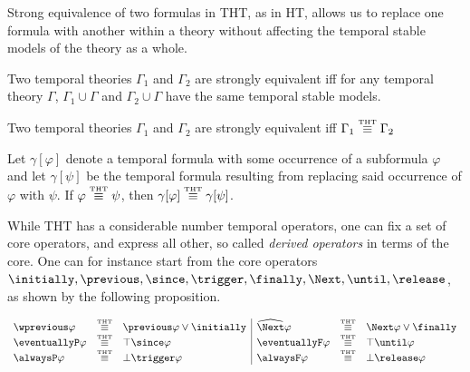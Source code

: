 Strong equivalence of two formulas in THT, as in HT, allows us to
replace one formula with another within a theory without affecting the
temporal stable models of the theory as a whole.

\begin{definition}
  Two temporal theories $\Gamma_1$ and $\Gamma_2$ are strongly
  equivalent iff for any temporal theory $\Gamma$,
  $\Gamma_1 \cup \Gamma$ and $\Gamma_2 \cup \Gamma$ have the same
  temporal stable models.
\end{definition}

\begin{proposition}
  Two temporal theories $\Gamma_1$ and $\Gamma_2$ are strongly equivalent
  iff $\Gamma_1 \stackrel{\normalfont\mbox{\tiny THT}}{\equiv} \Gamma_2$
\end{proposition}

\begin{proposition}
  Let $\gamma[\varphi]$ denote a temporal formula with some occurrence of a
  subformula $\varphi$ and let $\gamma[\psi]$ be the temporal formula resulting
  from replacing said occurrence of $\varphi$ with $\psi$. If
  $\varphi \stackrel{\normalfont\mbox{\tiny THT}}{\equiv} \psi$, then $\gamma[\varphi] \stackrel{\normalfont\mbox{\tiny THT}}{\equiv} \gamma[\psi]$.
\end{proposition}

While THT has a considerable number temporal operators, one can fix a
set of core operators, and express all other, so called \emph{derived
  operators} in terms of the core. One can for instance start from the
core operators
$\initially, \previous, \since, \trigger, \finally, \Next, \until,
\release$, as shown by the following proposition.

\begin{proposition}\label{prop:derived-op}
\[
\begin{array}{lll|lll}
\wprevious \varphi & \equivtht & \previous \varphi \vee \initially &
\wnext \varphi & \equivtht & \Next \varphi \vee \finally\\
\eventuallyP \varphi & \equivtht & \top \since \varphi &
\eventuallyF \varphi & \equivtht & \top \until \varphi\\
\alwaysP \varphi & \equivtht & \bot \trigger \varphi &
\alwaysF \varphi & \equivtht & \bot \release \varphi\\
\end{array}
\]
\end{proposition}

